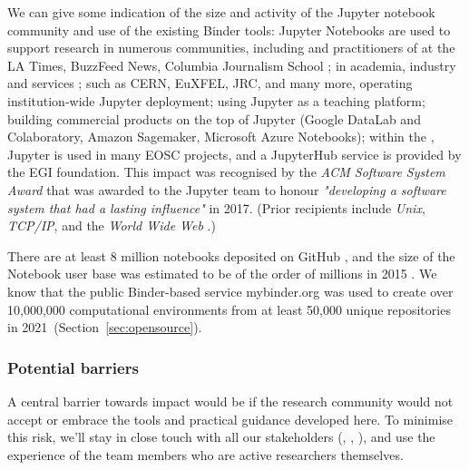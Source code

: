 \medskip

We can give some indication of the size and activity of the Jupyter notebook
community and use of the existing Binder tools: Jupyter Notebooks are used to
support research in numerous communities, including
{} and practitioners of  at the LA Times, BuzzFeed News, Columbia Journalism School
\cite{latimes-datadesk} \cite{columbia-nytimes} \cite{data-journalism};
 in academia, industry and services \cite{Perkel2018};
{} such as CERN, EuXFEL, JRC, and many more,
operating institution-wide Jupyter deployment;
{} using Jupyter as a teaching platform;
{} building commercial products on the
top of Jupyter (Google DataLab and Colaboratory, Amazon Sagemaker, Microsoft Azure
Notebooks);
within the , Jupyter is used in many EOSC
projects, and a JupyterHub service is provided by the EGI foundation.
This impact was recognised by the \emph{ACM Software System Award} that was
awarded to the Jupyter team to honour \emph{"developing a software system that
had a lasting influence"} in 2017. (Prior recipients include \emph{Unix},
\emph{TCP/IP}, and the \emph{World Wide Web} \cite{acm-award}.)

There are at least 8 million notebooks deposited on GitHub \cite{notebookcount}, and
the size of the Notebook user base was estimated to be of the order of
millions in 2015 \cite{jupyter-grant}. We know that the public Binder-based service mybinder.org
was used to create over 10,000,000 computational environments
from at least 50,000 unique repositories in 2021~(Section~\ref{sec:opensource}).



\subsubsection{Potential barriers}

A central barrier towards impact would be if the research community would not
accept or embrace the tools and practical guidance developed here.
To minimise this risk, we'll stay in close touch with all our stakeholders
(, , ), and use
the experience of the team members who are active researchers themselves.

